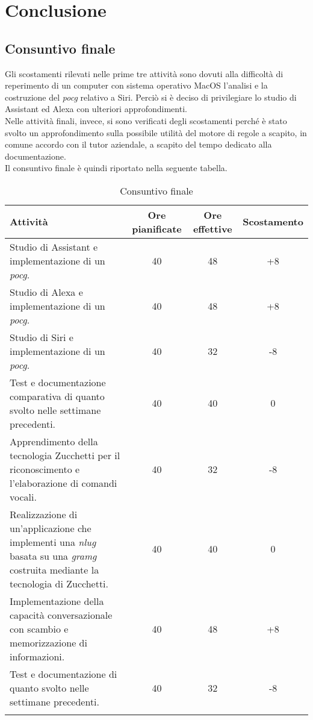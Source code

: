 
\chapter{Conclusione}
\label{cap:conclusione}


\section{Consuntivo finale}
Gli scostamenti rilevati nelle prime tre attività sono dovuti alla difficoltà di reperimento di un computer con sistema operativo MacOS l'analisi e la costruzione del \emph{\gls{pocg}} relativo a Siri. Perciò si è deciso di privilegiare lo studio di Assistant ed Alexa con ulteriori approfondimenti. \\
Nelle attività finali, invece, si sono verificati degli scostamenti perché è stato svolto un approfondimento sulla possibile utilità del motore di regole a scapito, in comune accordo con il tutor aziendale, a scapito del tempo dedicato alla documentazione. \\
Il consuntivo finale è quindi riportato nella seguente tabella.
	\begin{longtable}{|p{4.5cm}|c|c|c|}
		\hline
		\textbf{Attività} & \textbf{Ore pianificate} & \textbf{Ore effettive} & \textbf{Scostamento} \\
		\hline
		Studio di Assistant e implementazione di un \emph{\gls{pocg}}. & 40 & 48 & +8 \\
		\hline
		Studio di Alexa e implementazione di un \emph{\gls{pocg}}. & 40 & 48 & +8 \\
		\hline
		Studio di Siri e implementazione di un \emph{\gls{pocg}}. & 40 & 32 & -8 \\
		\hline
		Test e documentazione comparativa di quanto svolto nelle settimane precedenti. & 40 & 40 & 0 \\
		\hline
		Apprendimento della tecnologia Zucchetti per il riconoscimento e l'elaborazione di comandi vocali. & 40 & 32 & -8 \\
		\hline
		Realizzazione di un'applicazione che implementi una \emph{\gls{nlug}} basata su una \emph{\gls{gramg}} costruita mediante la tecnologia di Zucchetti. & 40 & 40 & 0 \\
		\hline
		Implementazione della capacità conversazionale con scambio e memorizzazione di informazioni. & 40 & 48 & +8 \\
		\hline
		Test e documentazione di quanto svolto nelle settimane precedenti. & 40 & 32 & -8 \\	
		\hline
		\caption{Consuntivo finale}
	\end{longtable}
